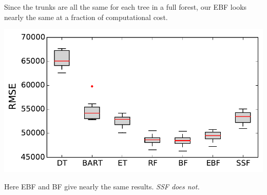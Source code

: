 \documentclass[11pt,xcolor=svgnames]{beamer}
\begin{document}
\begin{frame}


Since the trunks are all the same for each tree in a full forest,
our EBF looks nearly the same at a fraction of computational cost.

\begin{center}
\includegraphics[width=.85\textwidth]{graphs/ca_rmse}
\end{center}

Here EBF and BF give nearly the same results.  {\it SSF does not.}


\end{frame}
\end{document}
